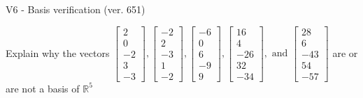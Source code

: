 \begin{exercise}
  \begin{exerciseTitle}V6 - Basis verification (ver. 651)\end{exerciseTitle}
  \begin{exerciseStatement}
    Explain why the vectors \(\left[\begin{array}{r}
2 \\
0 \\
-2 \\
3 \\
-3
\end{array}\right] , \left[\begin{array}{r}
-2 \\
2 \\
-3 \\
1 \\
-2
\end{array}\right] , \left[\begin{array}{r}
-6 \\
0 \\
6 \\
-9 \\
9
\end{array}\right] , \left[\begin{array}{r}
16 \\
4 \\
-26 \\
32 \\
-34
\end{array}\right] , \text{ and } \left[\begin{array}{r}
28 \\
6 \\
-43 \\
54 \\
-57
\end{array}\right]\) are or are not a basis of \(\mathbb{R}^5\)	



\end{exerciseStatement}
\end{exercise}
